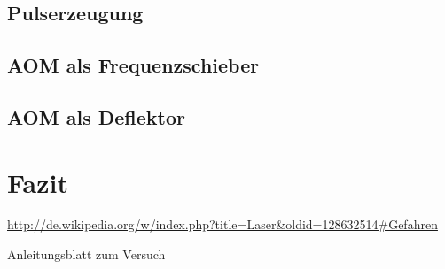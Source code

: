 \documentclass[bigchapter,colorback,accentcolor=tud4b,linedtoc,11pt]{tudreport}
\begin{document}
\section{Pulserzeugung}

\section{AOM als Frequenzschieber}

\section{AOM als Deflektor}

\chapter{Fazit}

\cleardoublepage{}
\newpage
\begin{thebibliography}{100}
    \url{http://de.wikipedia.org/w/index.php?title=Laser&oldid=128632514#Gefahren}
   
    Anleitungsblatt zum Versuch
\end{thebibliography}

\cleardoublepage{}
\end{document}
